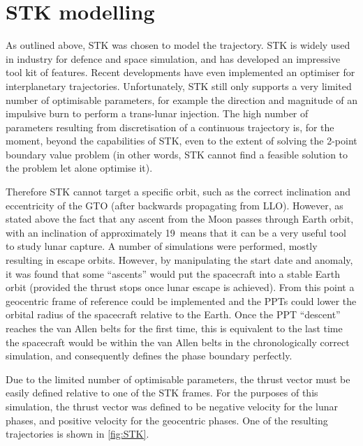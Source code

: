 \section{STK modelling} \label{sec:STK}

As outlined above, STK was chosen to model the trajectory. STK is widely used in industry for defence and space simulation, and has developed an impressive tool kit of features. Recent developments have even implemented an optimiser for interplanetary trajectories. Unfortunately, STK still only supports a very limited number of optimisable parameters, for example the direction and magnitude of an impulsive burn to perform a trans-lunar injection. The 
high number of parameters resulting from discretisation of a continuous trajectory is, for the moment, beyond the capabilities of STK, even to the extent of solving the 2-point boundary value problem (in other words, STK cannot find a feasible solution to the problem let alone optimise it).

Therefore STK cannot target a specific orbit, such as the correct inclination and eccentricity of the GTO (after backwards propagating from LLO). However, as stated above the fact that any ascent from the Moon passes through Earth orbit, with an inclination of approximately 19\degrees\ means that it can be a very useful tool to study lunar capture. A number of simulations were performed, mostly resulting in escape orbits. However, by manipulating the start date and anomaly, it was found that some \enquote{ascents} would put the spacecraft into a stable Earth orbit (provided the thrust stops once lunar escape is achieved). From this point a geocentric frame of reference could be implemented and the PPTs could lower the orbital radius of the spacecraft relative to the Earth. Once the PPT \enquote{descent} reaches the van Allen belts for the first time, this is equivalent to the last time the spacecraft would be within the van Allen belts in the chronologically correct simulation, and consequently defines the phase boundary perfectly.

Due to the limited number of optimisable parameters, the thrust vector must be easily defined relative to one of the STK frames. For the purposes of this simulation, the thrust vector was defined to be negative velocity for the lunar phases, and positive velocity for the geocentric phases. One of the resulting trajectories is shown in \autoref{fig:STK}.

